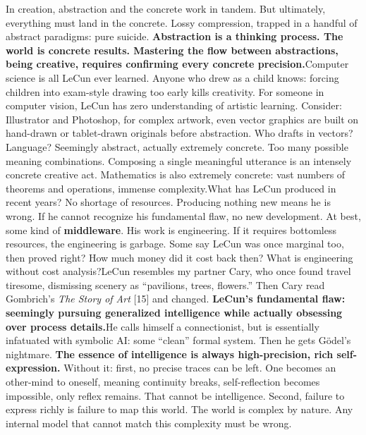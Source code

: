 \documentclass[11pt]{article}
\renewcommand{\\}[1][\mynewlineskip]{\oldnewline[#1]}
\begin{document}
In creation, abstraction and the concrete work in tandem. But ultimately, everything must land in the concrete. Lossy compression, trapped in a handful of abstract paradigms: pure suicide. \textbf{Abstraction is a thinking process. The world is concrete results. Mastering the flow between abstractions, being creative, requires confirming every concrete precision.}\\
Computer science is all LeCun ever learned. Anyone who drew as a child knows: forcing children into exam-style drawing too early kills creativity. For someone in computer vision, LeCun has zero understanding of artistic learning. Consider: Illustrator and Photoshop, for complex artwork, even vector graphics are built on hand-drawn or tablet-drawn originals before abstraction. Who drafts in vectors?\\
Language? Seemingly abstract, actually extremely concrete. Too many possible meaning combinations. Composing a single meaningful utterance is an intensely concrete creative act. Mathematics is also extremely concrete: vast numbers of theorems and operations, immense complexity.\\
What has LeCun produced in recent years? No shortage of resources. Producing nothing new means he is wrong. If he cannot recognize his fundamental flaw, no new development. At best, some kind of \textbf{middleware}. His work is engineering. If it requires bottomless resources, the engineering is garbage. Some say LeCun was once marginal too, then proved right? How much money did it cost back then? What is engineering without cost analysis?\\
LeCun resembles my partner Cary, who once found travel tiresome, dismissing scenery as ``pavilions, trees, flowers.'' Then Cary read Gombrich's \textit{The Story of Art} [15] and changed. \textbf{LeCun's fundamental flaw: seemingly pursuing generalized intelligence while actually obsessing over process details.}\\
He calls himself a connectionist, but is essentially infatuated with symbolic AI: some ``clean'' formal system. Then he gets Gödel's nightmare. \textbf{The essence of intelligence is always high-precision, rich self-expression.} Without it: first, no precise traces can be left. One becomes an other-mind to oneself, meaning continuity breaks, self-reflection becomes impossible, only reflex remains. That cannot be intelligence. Second, failure to express richly is failure to map this world. The world is complex by nature. Any internal model that cannot match this complexity must be wrong.\\
\end{document}

